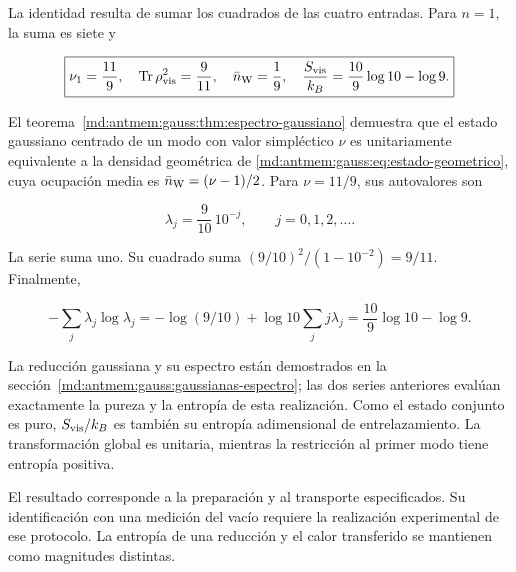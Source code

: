 La identidad resulta de sumar los cuadrados de las cuatro entradas. Para \(n=1\), la suma es siete y

\begin{equation}
\boxed{\nu_1=\frac{11}{9},\quad
\operatorname{Tr}\rho_{\rm vis}^2=\frac9{11},\quad
\bar n_{\rm W}=\frac19,\quad
\frac{S_{\rm vis}}{k_B}=\frac{10}{9}\log10-\log9.}
\label{md:antmem:cuantica:eq:5.9}
\end{equation}

El teorema~\ref{md:antmem:gauss:thm:espectro-gaussiano} demuestra que el estado gaussiano centrado de un modo con valor simpléctico \(\nu\) es unitariamente equivalente a la densidad geométrica de \eqref{md:antmem:gauss:eq:estado-geometrico}, cuya ocupación media es \(\bar n_{\rm W}=(\nu-1)/2\). Para \(\nu=11/9\), sus autovalores son

\begin{equation}
\lambda_j=\frac9{10}\,10^{-j},\qquad j=0,1,2,\ldots.
\label{md:antmem:cuantica:eq:5.10}
\end{equation}

La serie suma uno. Su cuadrado suma
\((9/10)^2/(1-10^{-2})=9/11\). Finalmente,

\[
-\sum_j\lambda_j\log\lambda_j
=-\log(9/10)+\log10\sum_jj\lambda_j
=\frac{10}{9}\log10-\log9.
\]

La reducción gaussiana y su espectro están demostrados en la sección~\ref{md:antmem:gauss:gaussianas-espectro}; las dos series anteriores evalúan exactamente la pureza y la entropía de esta realización. Como el estado conjunto es puro, \(S_{\rm vis}/k_B\) es también su entropía adimensional de entrelazamiento. La transformación global es unitaria, mientras la restricción al primer modo tiene entropía positiva.

El resultado corresponde a la preparación y al transporte especificados. Su identificación con una medición del vacío requiere la realización experimental de ese protocolo. La entropía de una reducción y el calor transferido se mantienen como magnitudes distintas.

